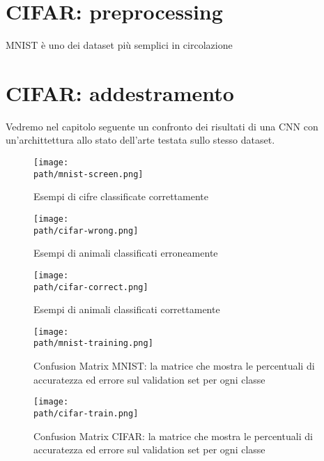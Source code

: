 \section{CIFAR: preprocessing}
MNIST è uno dei dataset più semplici in circolazione
\section{CIFAR: addestramento}


Vedremo nel capitolo seguente un confronto dei risultati di una CNN con un'archittettura allo stato dell'arte testata sullo stesso dataset. 



\begin{figure}[h!]
 \centering
 \texttt{[image: \\path/mnist-screen.png]} 
 \caption{Esempi di cifre classificate correttamente}
 \label{fig:mnist-correct}
\end{figure}

\begin{figure}[h!]
 \centering
 \texttt{[image: \\path/cifar-wrong.png]} 
 \caption{Esempi di animali classificati erroneamente}
 \label{fig:cifar-wrong}
\end{figure}

\begin{figure}[h!]
 \centering
 \texttt{[image: \\path/cifar-correct.png]} 
 \caption{Esempi di animali classificati correttamente}
 \label{fig:cifar-correct}
\end{figure}

\begin{figure}[h!]
 \centering
 \texttt{[image: \\path/mnist-training.png]} 
 \caption{Confusion Matrix MNIST: la matrice che mostra le percentuali di accuratezza ed errore sul validation set per ogni classe}
 \label{fig:mnist-training}
\end{figure}

\begin{figure}[h!]
 \centering
 \texttt{[image: \\path/cifar-train.png]} 
 \caption{Confusion Matrix CIFAR: la matrice che mostra le percentuali di accuratezza ed errore sul validation set per ogni classe}
 \label{fig:cifar-training}
\end{figure}

